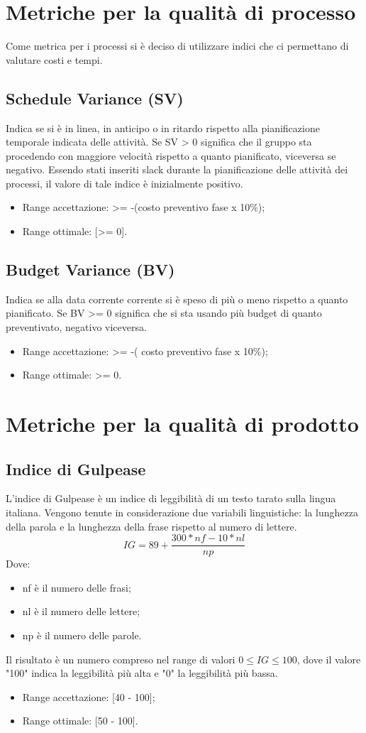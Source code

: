 \section{Metriche per la qualità di processo}
Come metrica per i processi si è deciso di utilizzare indici che ci permettano di valutare costi e tempi. 
\subsection{Schedule Variance (SV)}
Indica se si è in linea, in anticipo o in ritardo rispetto alla pianificazione temporale indicata delle attività. 
Se SV > 0 significa che il gruppo sta procedendo con maggiore velocità rispetto a quanto pianificato, viceversa se negativo. 
Essendo stati inseriti slack durante la pianificazione delle attività dei processi, il valore di tale indice è inizialmente positivo.
\begin{itemize}
	\item Range accettazione: >= -(costo preventivo fase x 10\%);
	\item Range ottimale: [>= 0]. 
\end{itemize}
\subsection{Budget Variance (BV)}
Indica se alla data corrente corrente si è speso di più o meno rispetto a quanto pianificato.
Se BV >= 0 significa che si sta usando più budget di quanto preventivato, negativo viceversa.
\begin{itemize}
	\item  Range accettazione: >= -( costo preventivo fase x 10\%);
	\item Range ottimale: >= 0.
\end{itemize}
\section{Metriche per la qualità di prodotto}
\subsection{Indice di Gulpease} \label{IndicediGulpease}
 L'indice di Gulpease è un indice di leggibilità di un testo tarato sulla lingua italiana. Vengono tenute in considerazione due variabili linguistiche:  la lunghezza della parola e la lunghezza della frase rispetto al numero di lettere.
\[ IG = 89+ \frac{300*nf - 10*nl}{np} \]
Dove:
\begin{itemize}
	\item nf è il numero delle frasi;
	\item nl è il numero delle lettere;
	\item np è il numero delle parole.
\end{itemize}
Il risultato è un numero compreso nel range di valori $0 \le{IG} \le{100}$, dove il valore "100" indica la leggibilità più alta e "0" la leggibilità più bassa.
\begin{itemize}
	\item Range accettazione: [40 - 100];
	\item Range ottimale: [50 - 100].
\end{itemize}
